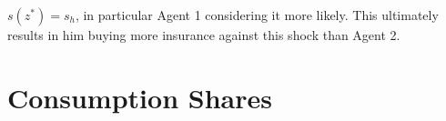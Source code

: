 \documentclass[12pt]{article}
\begin{document}
$s(z^*)=s_h$, in particular Agent 1 considering it more likely. This ultimately results in him buying more insurance against this shock than Agent 2. 
%
%
%
%
%

\section{Consumption Shares}
\end{document}
